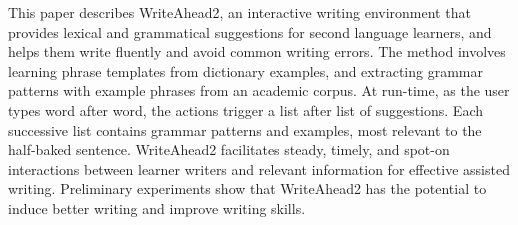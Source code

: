 This paper describes WriteAhead2, an interactive writing environment that provides lexical and grammatical suggestions for second language learners, and helps them write fluently and avoid common writing errors. The method involves learning phrase templates from dictionary examples, and extracting grammar patterns with example phrases from an academic corpus. At run-time, as the user types word after word, the actions trigger a list after list of suggestions. Each successive list contains grammar patterns and examples, most relevant to the half-baked sentence. WriteAhead2 facilitates steady, timely, and spot-on interactions between learner writers and relevant information for effective assisted writing. Preliminary experiments show that WriteAhead2 has the potential to induce better writing and improve writing skills.
